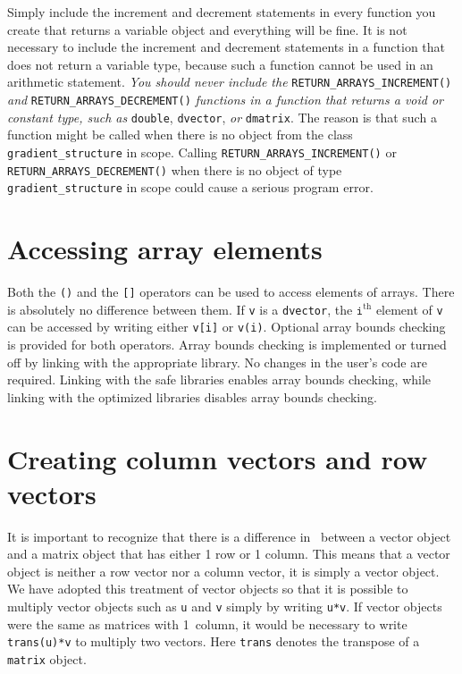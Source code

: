 \documentclass{admbmanual}
\begin{document}
Simply include the increment and decrement statements in every function
you create that returns a variable object and
everything will be fine. 
It is not necessary to include the increment and decrement statements
in a function that does not return a variable type, because
such a function cannot be used in an arithmetic statement.
\textit{You should never include the} \texttt{RETURN\_ARRAYS\_INCREMENT()} \textit{and}
\texttt{RETURN\_ARRAYS\_DECREMENT()} \textit{functions in a function that returns
a void or constant type, such as} \texttt{double}, \texttt{dvector}, \textit{or} \texttt{dmatrix}.
The reason is that such a function might be called when there is
no object from the class \texttt{gradient\_structure} in scope. 
Calling \texttt{RETURN\_ARRAYS\_INCREMENT()} or 
\texttt{RETURN\_ARRAYS\_DE\-CRE\-MENT()} when there is no object of
type \texttt{gradient\_structure} in scope could cause  
a serious program error.


\section{Accessing array elements}

Both the \texttt{()} and the \texttt{[]} operators can be used to access elements 
of arrays. There is absolutely no difference between them. 
If \texttt{v} is a \texttt{dvector}, the $\texttt{i}^\textrm{th}$
element of \texttt{v} can be accessed by writing either \texttt{v[i]}
or \texttt{v(i)}.
Optional array bounds checking is provided for both operators.
Array bounds checking is implemented or turned off
by linking with the appropriate library. No changes in the user's code
are required. Linking with the safe libraries 
enables array 
bounds checking, while linking with the optimized libraries 
disables array bounds checking. 


\section{Creating column vectors and row vectors}

It is important to recognize that there is a difference in \scAD\ between
a vector object and a matrix object that has either 1 row or 1 column.
This means that a vector object is neither a row vector nor a column
vector, it is simply a vector object. We have adopted this
treatment of vector objects so that it is possible to
multiply vector objects such as \texttt{u} and \texttt{v}
simply by writing \texttt{u*v}. If vector objects were the
same as matrices with 1~column, it would be necessary to
write \texttt{trans(u)*v} to multiply two vectors. Here \texttt{trans}
denotes the transpose of a \texttt{matrix} object.
\end{document}
